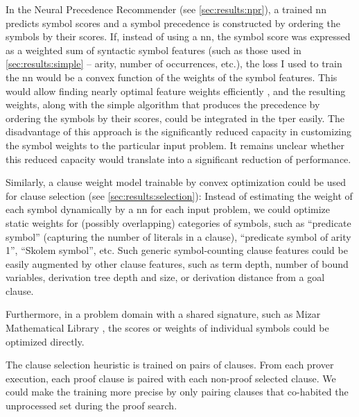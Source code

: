 
In the Neural Precedence Recommender (see \cref{sec:results:npr}),
a trained \gls{nn} predicts symbol scores and
a symbol precedence is constructed by ordering the symbols by their scores.
If, instead of using a \gls{nn}, the symbol score was expressed as a weighted sum of syntactic symbol features (such as those used in \cref{sec:results:simple} -- arity, number of occurrences, etc.),
the loss I used to train the \gls{nn} would be a convex function of the weights of the symbol features.
This would allow finding nearly optimal feature weights efficiently \cite{},
and the resulting weights, along with the simple algorithm that produces the precedence by ordering the symbols by their scores,
could be integrated in the \gls{tper} easily.
The disadvantage of this approach is the significantly reduced capacity in customizing the symbol weights to the particular input problem.
It remains unclear whether this reduced capacity would translate into a significant reduction of performance.

Similarly, a clause weight model trainable by convex optimization could be used for clause selection (see \cref{sec:results:selection}):
Instead of estimating the weight of each symbol dynamically by a \gls{nn} for each input problem,
we could optimize static weights for (possibly overlapping) categories of symbols,
such as
\enquote{predicate symbol} (capturing the number of literals in a clause),
\enquote{predicate symbol of arity 1},
\enquote{Skolem symbol}, etc.
Such generic symbol-counting clause features could be easily augmented by other clause features,
such as term depth, number of bound variables, derivation tree depth and size, or derivation distance from a goal clause.

Furthermore, in a problem domain with a shared signature, such as Mizar Mathematical Library \cite{},
the scores or weights of individual symbols could be optimized directly.

The clause selection heuristic is trained on pairs of clauses.
From each prover execution, each proof clause is paired with each non-proof selected clause.
We could make the training more precise by only pairing clauses that co-habited the unprocessed set during the proof search.

